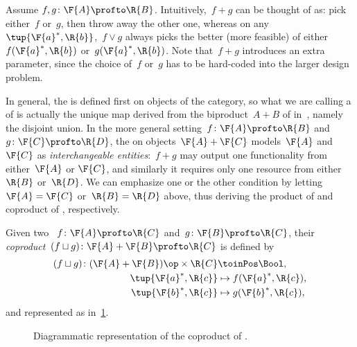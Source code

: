Assume $f,g \colon \F{A} \profto \R{B}$.
Intuitively,~$f+g$ can be thought of as: pick either~$f$ or~$g$, then throw away the other one, whereas on any~$\tup{\F{a}^*,\R{b}}$,~$f \vee g$ always picks the better (more feasible) of either~$f(\F{a}^*,\R{b})$ or~$g(\F{a}^*,\R{b})$.
Note that~$f+g$ introduces an extra parameter, since the choice of~$f$ or~$g$ has to be hard-coded into the larger design problem.

In general, the  is defined first on objects of the category, so what we are calling a  of  is actually the unique map derived from the biproduct~$A + B$ of  in~\DP, namely the disjoint union.
In the more general setting~$f\colon \F{A} \profto \R{B}$ and~$g \colon \F{C} \profto \R{D}$, the  on objects~$\F{A} + \F{C}$ models~$\F{A}$ and $\F{C}$ as \emph{interchangeable entities}:~$f+g$ may output one functionality from either~$\F{A}$ or $\F{C}$, and similarly it requires only one resource from either~$\R{B}$ or~$\R{D}$.
We can emphasize one or the other condition by letting~$\F{A} = \F{C}$ or~$\R{B} =\R{D}$ above, thus deriving the product of  and coproduct of , respectively.

\begin{definition}
    \label{def:coproduct}
    Given two ~$f\colon \F{A} \profto \R{C}$ and~$g \colon \F{B} \profto \R{C}$, their \emph{coproduct}~$(f \sqcup g)\colon \F{A} + \F{B} \profto \R{C}$ is defined by
    \begin{equation}
        \begin{aligned}
            (f \sqcup g)
            \colon (\F{A} + \F{B})\op \times \R{C} & \toinPos \Bool, \\
            \tup{ \F{a}^*, \R{c}}                  & \mapsto f(\F{a}^*, \R{c}), \\
            \tup{ \F{b}^*, \R{c}}                  & \mapsto g(\F{b}^*, \R{c}),
        \end{aligned}
    \end{equation}
    and represented as in~\cref{fig:coproductdp}.
\end{definition}

\begin{figure}[h!]
    \begin{center}
    \end{center}
    \caption{Diagrammatic representation of the coproduct of . }
    \label{fig:coproductdp}
\end{figure}

